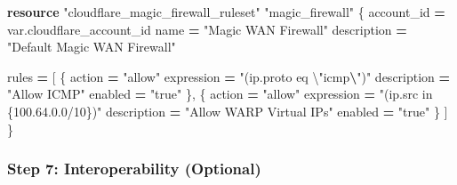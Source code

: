 \documentclass[
]{article}
\newenvironment{Shaded}{\begin{snugshade}}{\end{snugshade}}
\newcommand{\KeywordTok}[1]{\textcolor[rgb]{0.13,0.29,0.53}{\textbf{#1}}}
\newcommand{\NormalTok}[1]{#1}
\newcommand{\OperatorTok}[1]{\textcolor[rgb]{0.81,0.36,0.00}{\textbf{#1}}}
\newcommand{\StringTok}[1]{\textcolor[rgb]{0.31,0.60,0.02}{#1}}
\newcommand{\VariableTok}[1]{\textcolor[rgb]{0.00,0.00,0.00}{#1}}
\begin{document}
\begin{Shaded}
\begin{Highlighting}[numbers=left,,]
\KeywordTok{resource} \StringTok{"cloudflare\_magic\_firewall\_ruleset"} \StringTok{"magic\_firewall"}\NormalTok{ \{}
\NormalTok{  account\_id  }\OperatorTok{=} \VariableTok{var}\NormalTok{.cloudflare\_account\_id}
\NormalTok{  name        }\OperatorTok{=} \StringTok{"Magic WAN Firewall"}
\NormalTok{  description }\OperatorTok{=} \StringTok{"Default Magic WAN Firewall"}
 
\NormalTok{  rules }\OperatorTok{=}\NormalTok{ [}
\NormalTok{    \{}
\NormalTok{      action      }\OperatorTok{=} \StringTok{"allow"}
\NormalTok{      expression  }\OperatorTok{=} \StringTok{"(ip.proto eq \textbackslash{}"}\NormalTok{icmp}\OperatorTok{\textbackslash{}}\StringTok{")"}
\NormalTok{      description }\OperatorTok{=} \StringTok{"Allow ICMP"}
\NormalTok{      enabled     }\OperatorTok{=} \StringTok{"true"}
\NormalTok{    \},}
\NormalTok{    \{}
\NormalTok{      action      }\OperatorTok{=} \StringTok{"allow"}
\NormalTok{      expression  }\OperatorTok{=} \StringTok{"(ip.src in \{100.64.0.0/10\})"}
\NormalTok{      description }\OperatorTok{=} \StringTok{"Allow WARP Virtual IPs"}
\NormalTok{      enabled     }\OperatorTok{=} \StringTok{"true"}
\NormalTok{    \}}
\NormalTok{  ]}
\NormalTok{\}}
\end{Highlighting}
\end{Shaded}

\newpage{}

\subsubsection{Step 7: Interoperability
(Optional)}\label{step-7-interoperability-optional}
\end{document}

